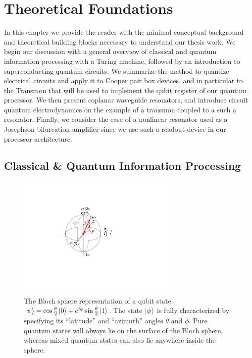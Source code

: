 \chapter{Theoretical Foundations} \label{chapter:theory}

In this chapter we provide the reader with the minimal conceptual background and theoretical building blocks necessary  to understand our thesis work. We begin our discussion with a general overview of classical and quantum information processing with a Turing machine, followed by an introduction to superconducting quantum circuits. We summarize the method to quantize electrical circuits and apply it to Cooper pair box devices, and in particular to the Transmon that will be used to implement the qubit register of our quantum processor. We then present coplanar waveguide resonators, and introduce circuit quantum electrodynamics on the example of a transmon coupled to a such a resonator. Finally, we consider the case of a nonlinear resonator used as a Josephson bifurcation amplifier since we use such a readout device in our processor architecture.

\section{Classical \& Quantum Information Processing}

\begin{figure}
	\includegraphics[width=8cm]{"./material/figures/introduction/bloch_sphere"}
	\caption{The Bloch sphere representation of a qubit state $\left| \psi \right> = \cos{\frac{\theta}{2}}\left| 0 \right>+e^{i\phi}\sin{\frac{\theta}{2}}\left| 1 \right>$. The state $\left| \psi \right>$ is fully characterized by specifying its ``latitude'' and ``azimuth'' angles $\theta$ and $\phi$. Pure quantum states will always lie on the surface of the Bloch sphere, whereas mixed quantum states can also lie anywhere inside the sphere.}
	\label{fig:BlochSphere}
\end{figure}

